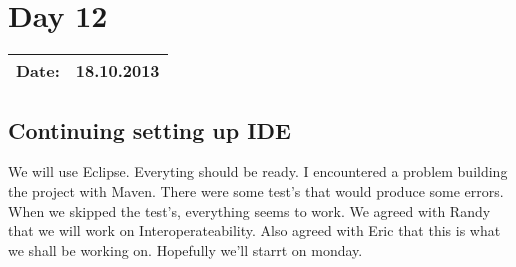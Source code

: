 \section{Day 12}
\begin{tabular}{|c|c|}
\hline
Date: & 18.10.2013 \\
\hline
\end{tabular}
\subsection{Continuing setting up IDE}
We will use Eclipse. Everyting should be ready. I encountered a problem building the project with Maven. There were some test's that would produce some errors.
When we skipped the test's, everything seems to work. We agreed with Randy that we will work on Interoperateability. Also agreed with Eric that this is what we shall be working on. Hopefully we'll starrt on monday.

